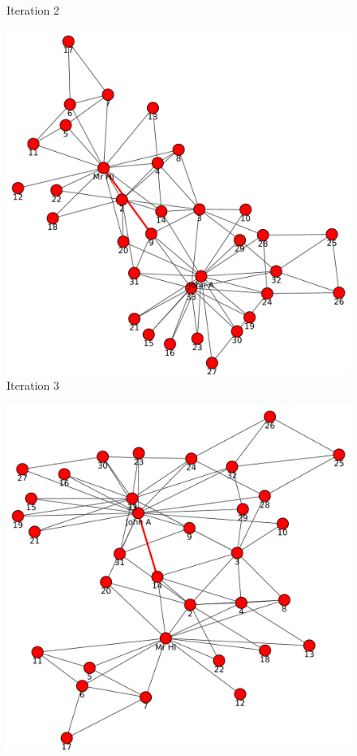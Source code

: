 \begin{itemize}
\begin{figure}[h!]
\begin{center}
\caption{Iteration 2}
\label{fig:q1fig2}
\end{center}
\end{figure}
\newpage
\begin{figure}[h!]
\begin{center}
\includegraphics[scale=0.55, keepaspectratio=true]{figures/graphs/EdgeHighlightedGraph3.pdf}
\caption{Iteration 3}
\label{fig:q1fig3}
\end{center}
\end{figure}
\newpage
\begin{figure}[h!]
\begin{center}
\includegraphics[scale=0.55, keepaspectratio=true]{figures/graphs/EdgeHighlightedGraph4.pdf}

\end{center}
\end{figure}
\end{itemize}
